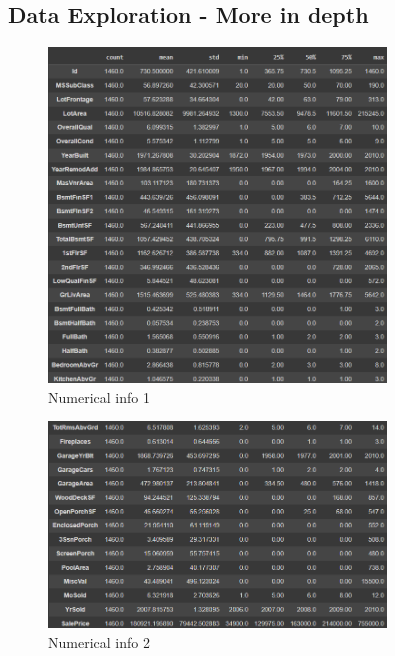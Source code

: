 \subsection{Data Exploration - More in depth}
\label{sec:data_exploration_more_in_depth}


\begin{figure}[h!]
    \centering
    \includegraphics[width=0.8\textwidth]{imgs/info1.png}
    \caption{Numerical info 1}
    \label{fig:info1}
\end{figure}

\begin{figure}[h!]
    \centering
    \includegraphics[width=0.8\textwidth]{imgs/info2.png}
    \caption{Numerical info 2}
    \label{fig:info2}
\end{figure}

